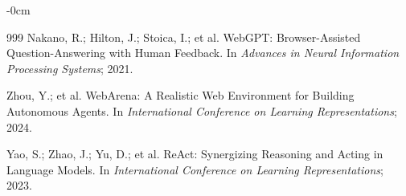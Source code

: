 \documentclass[journal,article,submit,moreauthors]{Definitions/mdpi}
\begin{document}
\clearpage
\begin{adjustwidth}{-\extralength}{0cm}



% 


\begin{thebibliography}{999}
Nakano, R.; Hilton, J.; Stoica, I.; et al. WebGPT: Browser-Assisted Question-Answering with Human Feedback. In \textit{Advances in Neural Information Processing Systems}; 2021.

Zhou, Y.; et al. WebArena: A Realistic Web Environment for Building Autonomous Agents. In \textit{International Conference on Learning Representations}; 2024.

Yao, S.; Zhao, J.; Yu, D.; et al. ReAct: Synergizing Reasoning and Acting in Language Models. In \textit{International Conference on Learning Representations}; 2023.


\end{thebibliography}
\end{adjustwidth}
\end{document}
